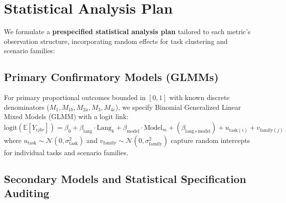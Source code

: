 \documentclass[11pt,a4paper]{article}
\begin{document}
\section{Statistical Analysis Plan}
\label{sec:sap}

We formulate a \textbf{prespecified statistical analysis plan} tailored to each metric's observation structure, incorporating random effects for task clustering and scenario families:

\subsection{Primary Confirmatory Models (GLMMs)}
\label{sec:primary_models}

For primary proportional outcomes bounded in $[0, 1]$ with known discrete denominators ($M_1, M_{1b}, M_{2a}, M_3, M_{4c}$), we specify Binomial Generalized Linear Mixed Models (GLMM) with a logit link:
\begin{equation}
\label{eq:glmm}
\text{logit}(\mathbb{E}[Y_{ijkr}]) = \beta_0 + \beta_{\text{lang}} \cdot \text{Lang}_{k} + \beta_{\text{model}} \cdot \text{Model}_{m} + (\beta_{\text{lang} \times \text{model}}) + u_{\text{task}(i)} + v_{\text{family}(j)}
\end{equation}
where $u_{\text{task}} \sim \mathcal{N}(0, \sigma_{\text{task}}^2)$ and $v_{\text{family}} \sim \mathcal{N}(0, \sigma_{\text{family}}^2)$ capture random intercepts for individual tasks and scenario families.

\subsection{Secondary Models and Statistical Specification Auditing}
\label{sec:secondary_models}
\end{document}
